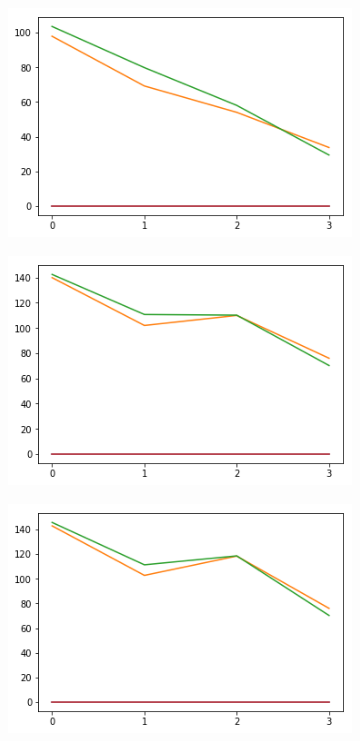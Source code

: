 \begin{figure}[h!]
  \begin{subfigure}[b]{0.3\linewidth}
    \includegraphics[width=\linewidth]{images/subst1/ef0_means.png}
    \caption{}
  \end{subfigure}
  \begin{subfigure}[b]{0.3\linewidth}
    \includegraphics[width=\linewidth]{images/subst1/ef1_means.png}
    \caption{}
  \end{subfigure}
  \begin{subfigure}[b]{0.3\linewidth}
    \includegraphics[width=\linewidth]{images/subst1/ef2_means.png}
    \caption{}
  \end{subfigure}
    

\end{figure}
